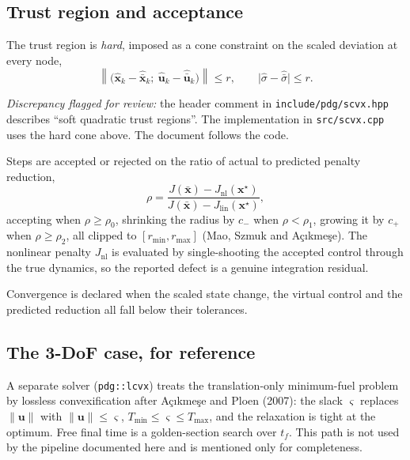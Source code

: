 \documentclass[11pt,a4paper]{article}
\newcommand{\vect}[1]{\mathbf{#1}}
\newcommand{\code}[1]{\texttt{#1}}
\begin{document}
\subsection{Trust region and acceptance}

The trust region is \emph{hard}, imposed as a cone constraint on the scaled
deviation at every node,
\begin{equation}
\left\lVert \bigl(\hat{\vect{x}}_k-\hat{\bar{\vect{x}}}_k;\ \hat{\vect{u}}_k-\hat{\bar{\vect{u}}}_k\bigr)\right\rVert \le r,
\qquad
\bigl\lvert \hat\sigma-\hat{\bar\sigma}\bigr\rvert \le r .
\end{equation}

\emph{Discrepancy flagged for review:} the header comment in
\code{include/pdg/scvx.hpp} describes ``soft quadratic trust regions''. The
implementation in \code{src/scvx.cpp} uses the hard cone above. The document
follows the code.

Steps are accepted or rejected on the ratio of actual to predicted penalty
reduction,
\begin{equation}
\rho = \frac{J(\bar{\vect{x}}) - J_{\mathrm{nl}}(\vect{x}^\star)}
            {J(\bar{\vect{x}}) - J_{\mathrm{lin}}(\vect{x}^\star)},
\end{equation}
accepting when $\rho\ge\rho_0$, shrinking the radius by $c_-$ when
$\rho<\rho_1$, growing it by $c_+$ when $\rho\ge\rho_2$, all clipped to
$[r_{\min},r_{\max}]$ (Mao, Szmuk and A\c{c}{\i}kme\c{s}e). The nonlinear
penalty $J_{\mathrm{nl}}$ is evaluated by single-shooting the accepted control
through the true dynamics, so the reported defect is a genuine integration
residual.

Convergence is declared when the scaled state change, the virtual control and
the predicted reduction all fall below their tolerances.

\subsection{The 3-DoF case, for reference}

A separate solver (\code{pdg::lcvx}) treats the translation-only minimum-fuel
problem by lossless convexification after A\c{c}{\i}kme\c{s}e and Ploen (2007):
the slack $\varsigma$ replaces $\lVert\vect{u}\rVert$ with
$\lVert\vect{u}\rVert\le\varsigma$, $T_{\min}\le\varsigma\le T_{\max}$, and the
relaxation is tight at the optimum. Free final time is a golden-section search
over $t_f$. This path is not used by the pipeline documented here and is
mentioned only for completeness.
\end{document}
